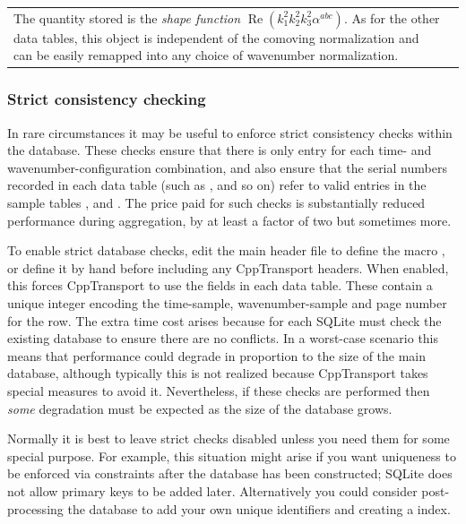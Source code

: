 \documentclass[11pt,a4paper]{article}
\renewcommand{\texttt}[1]{{\ttfamily\fontseries{l}\selectfont{#1}}}
\newcommand{\packagefont}{\sffamily}
\newcommand{\CppTransport}{{\packagefont CppTransport}}
\newcommand{\SQLite}{{\packagefont SQLite}}
\newcommand{\file}[1]{\texttt{{#1}}}
\newenvironment{sqltablelist}{\renewcommand{\arraystretch}{1.3}\small}{}
\DeclareMathOperator{\realpart}{Re}
\renewcommand{\Re}{\realpart}
\begin{document}
\begin{sqltablelist}
\begin{enumerate}
\begin{tabular}{p{2.5cm}p{11.2cm}}
        The quantity stored is the \emph{shape function}
        $\Re(k_1^2 k_2^2 k_3^2 \alpha^{abc})$.
        As for the other data tables, this object is independent of the
        comoving normalization and can be easily remapped into
        any choice of wavenumber normalization.
    \end{tabular}
\end{enumerate}    
\end{sqltablelist}

\subsubsection{Strict consistency checking}
In rare circumstances it may be useful to enforce strict consistency checks
within the database.
These checks ensure that there is only entry for each time- and wavenumber-configuration
combination,
and also ensure that the serial numbers
recorded in each data table
(such as \texttt{backg}, \texttt{twopf_re} and so on)
refer to valid entries in the sample tables
\texttt{time_samples},
\texttt{twopf_samples}
and
\texttt{threepf_samples}.
The price paid for such checks is substantially reduced
\texttt{INSERT} performance during aggregation, by at least a factor of
two but sometimes more.

To enable strict database checks, edit the main header file
\file{transport.h}
to define the macro
\texttt{CPPTRANSPORT_STRICT_CONSISTENCY}, or define it by hand
before including any {\CppTransport} headers.
When enabled, this forces {\CppTransport} to use the
\texttt{unique_id} fields in each data table.
These contain a unique integer encoding the
time-sample, wavenumber-sample and page number for the row.
The extra time cost arises because for each
\texttt{INSERT} {\SQLite} must check
the existing database to ensure there are no conflicts.
In a worst-case scenario
this means that \texttt{INSERT} performance could degrade
in proportion to the size of the main database, although typically
this is not realized because {\CppTransport} takes special measures to avoid it.
Nevertheless, if these checks are performed then
\emph{some} degradation must be expected as the size of the database
grows.

Normally it is best to leave strict checks disabled unless you need them for some special
purpose. For example, this situation might arise if
you want uniqueness to be enforced via
\texttt{PRIMARY KEY} constraints after the database has been constructed;
{\SQLite} does not allow primary keys to be added later.
Alternatively you could consider post-processing the database to add your
own unique identifiers and creating a
\texttt{UNIQUE} index.
\end{document}
